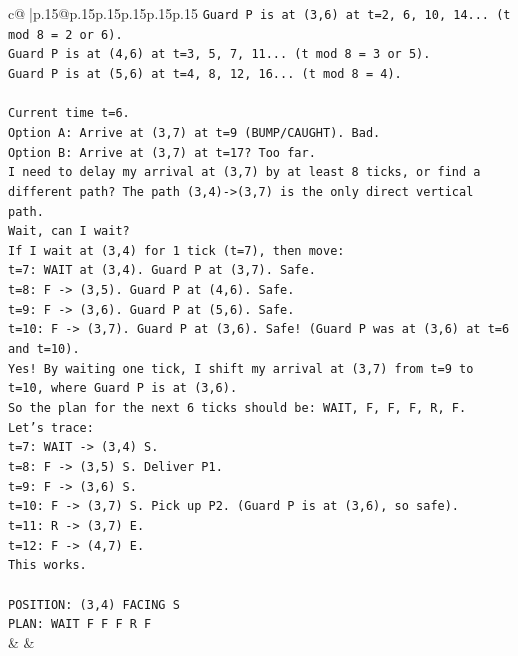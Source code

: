 \documentclass{article}
\begin{document}
{\begin{supertabular}{c@{$\;$}|p{.15\linewidth}@{}p{.15\linewidth}p{.15\linewidth}p{.15\linewidth}p{.15\linewidth}p{.15\linewidth}}
{{{\texttt{Guard P is at (3,6) at t=2, 6, 10, 14... (t mod 8 = 2 or 6).} \\
\texttt{Guard P is at (4,6) at t=3, 5, 7, 11... (t mod 8 = 3 or 5).} \\
\texttt{Guard P is at (5,6) at t=4, 8, 12, 16... (t mod 8 = 4).} \\
\\ 
\texttt{Current time t=6.} \\
\texttt{Option A: Arrive at (3,7) at t=9 (BUMP/CAUGHT). Bad.} \\
\texttt{Option B: Arrive at (3,7) at t=17? Too far.} \\
\texttt{I need to delay my arrival at (3,7) by at least 8 ticks, or find a different path? The path (3,4){-}>(3,7) is the only direct vertical path.} \\
\texttt{Wait, can I wait?} \\
\texttt{If I wait at (3,4) for 1 tick (t=7), then move:} \\
\texttt{t=7: WAIT at (3,4). Guard P at (3,7). Safe.} \\
\texttt{t=8: F {-}> (3,5). Guard P at (4,6). Safe.} \\
\texttt{t=9: F {-}> (3,6). Guard P at (5,6). Safe.} \\
\texttt{t=10: F {-}> (3,7). Guard P at (3,6). Safe! (Guard P was at (3,6) at t=6 and t=10).} \\
\texttt{Yes! By waiting one tick, I shift my arrival at (3,7) from t=9 to t=10, where Guard P is at (3,6).} \\
\texttt{So the plan for the next 6 ticks should be: WAIT, F, F, F, R, F.} \\
\texttt{Let's trace:} \\
\texttt{t=7: WAIT {-}> (3,4) S.} \\
\texttt{t=8: F {-}> (3,5) S. Deliver P1.} \\
\texttt{t=9: F {-}> (3,6) S.} \\
\texttt{t=10: F {-}> (3,7) S. Pick up P2. (Guard P is at (3,6), so safe).} \\
\texttt{t=11: R {-}> (3,7) E.} \\
\texttt{t=12: F {-}> (4,7) E.} \\
\texttt{This works.} \\
\\ 
\texttt{POSITION: (3,4) FACING S} \\
\texttt{PLAN: WAIT F F F R F} \\
            }
        }
    }
    & & \\ \\


\end{supertabular}}
\end{document}

